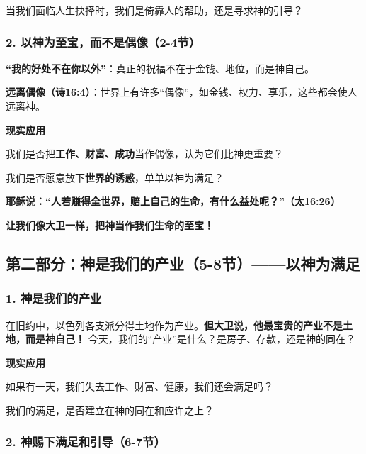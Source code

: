 \documentclass[a4paper, 12pt]{article}
\begin{document}
\hspace{0.6cm}当我们面临人生抉择时，我们是倚靠人的帮助，还是寻求神的引导？  


\subsubsection*{2. 以神为至宝，而不是偶像（2-4节） }  

\hspace{0.6cm}\textbf{“我的好处不在你以外”}：真正的祝福不在于金钱、地位，而是神自己。 

\textbf{远离偶像（诗16:4）}：世界上有许多“偶像”，如金钱、权力、享乐，这些都会使人远离神。  
\vspace{0.2cm}

\textbf{现实应用} 

\hspace{0.6cm}我们是否把\textbf{工作、财富、成功}当作偶像，认为它们比神更重要？  

\hspace{0.6cm}我们是否愿意放下\textbf{世界的诱惑}，单单以神为满足？  

\textbf{耶稣说：“人若赚得全世界，赔上自己的生命，有什么益处呢？”（太16:26）}  

\textbf{让我们像大卫一样，把神当作我们生命的至宝！ }

\subsection*{第二部分：神是我们的产业（5-8节）——以神为满足 }

\subsubsection*{1. 神是我们的产业  }
\hspace{0.6cm}在旧约中，以色列各支派分得土地作为产业。\textbf{但大卫说，他最宝贵的产业不是土地，而是神自己！}  
今天，我们的“产业”是什么？是房子、存款，还是神的同在？  
\vspace{0.2cm}

\textbf{现实应用} 

\hspace{0.6cm}如果有一天，我们失去工作、财富、健康，我们还会满足吗？ 

\hspace{0.6cm}我们的满足，是否建立在神的同在和应许之上？

\subsubsection*{2. 神赐下满足和引导（6-7节） }
\end{document}
